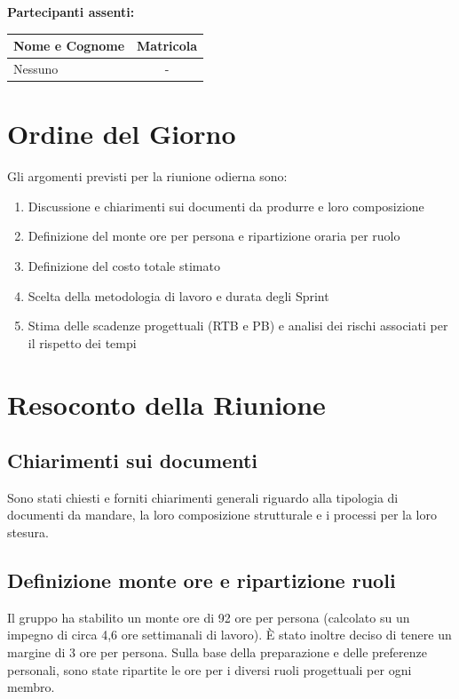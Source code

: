 \documentclass[a4paper, 11pt]{article}
\begin{document}
\vspace{0.5cm}
\textbf{Partecipanti assenti:} \\
\vspace{0.2cm}
\renewcommand{\arraystretch}{1.2}
\begin{tabular}{|l|c|}
\hline
\textbf{Nome e Cognome} & \textbf{Matricola} \\ \hline
 Nessuno & - \\ \hline
\end{tabular}


\vspace{0.5cm}
\section{Ordine del Giorno}
Gli argomenti previsti per la riunione odierna sono:
\begin{enumerate}
    \item Discussione e chiarimenti sui documenti da produrre e loro composizione
    \item Definizione del monte ore per persona e ripartizione oraria per ruolo
    \item Definizione del costo totale stimato
    \item Scelta della metodologia di lavoro e durata degli Sprint
    \item Stima delle scadenze progettuali (RTB e PB) e analisi dei rischi associati per il rispetto dei tempi
\end{enumerate}

\newpage
\section{Resoconto della Riunione}

\subsection{Chiarimenti sui documenti} 
Sono stati chiesti e forniti chiarimenti generali riguardo alla tipologia di documenti da mandare, la loro composizione strutturale e i processi per la loro stesura.

\subsection{Definizione monte ore e ripartizione ruoli}
Il gruppo ha stabilito un monte ore di 92 ore per persona (calcolato su un impegno di circa 4,6 ore settimanali di lavoro). È stato inoltre deciso di tenere un margine di 3 ore per persona. Sulla base della preparazione e delle preferenze personali, sono state ripartite le ore per i diversi ruoli progettuali per ogni membro.
\end{document}
